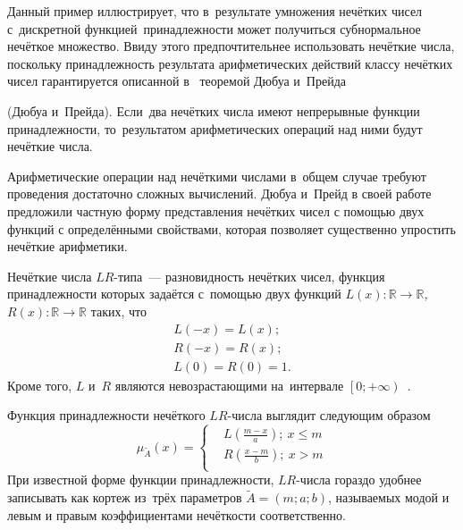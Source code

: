 Данный пример иллюстрирует, что в~результате умножения нечётких чисел с~дискретной функцией~принадлежности может получиться субнормальное нечёткое множество. Ввиду этого предпочтительнее использовать нечёткие числа, поскольку принадлежность результата арифметических действий классу нечётких чисел гарантируется описанной в~\cite{Rutkovskaya} теоремой Дюбуа и~Прейда
\begin{theorem}
\label{th:dubois-prade}
(Дюбуа и~Прейда). Если~два нечётких числа имеют непрерывные функции принадлежности, то~результатом арифметических операций над ними будут нечёткие числа.
\end{theorem}

Арифметические операции над нечёткими числами в~общем случае требуют проведения достаточно сложных вычислений. Дюбуа и~Прейд в своей работе~\cite{Dubois_Prade} предложили частную форму представления нечётких чисел с помощью двух функций с определёнными свойствами, которая позволяет существенно упростить нечёткие арифметики. 
\begin{mydef}
Нечёткие числа $LR$-типа~--– разновидность нечётких чисел, функция принадлежности которых задаётся с~помощью двух функций $L(x):\mathbb{R} \to \mathbb{R}$, $R(x):\mathbb{R} \to \mathbb{R}$ таких, что 
\begin{gather*}
	L\left( -x \right)=L\left( x \right); \\
	R\left( -x \right)=R\left( x \right); \\
	L\left( 0 \right)=R\left(  0 \right)=1.
\end{gather*}
Кроме того, $L$ и~$R$ являются невозрастающими на~интервале $\left[ 0;+\infty  \right)$~\cite{Rutkovskaya}.
\end{mydef}
Функция принадлежности нечёткого $LR$-числа выглядит следующим образом
\begin{equation}
\label{eq:membership-lr-general}
	 \mu_{\tilde A}\left( x \right)=\left\{ 
		 \begin{aligned}
			 & L\left( \frac{m-x}{a} \right);\ x \leqslant m \\ 
			 & R\left( \frac{x-m}{b} \right);\ x>m \\ 
		 \end{aligned} 
	 \right.
\end{equation}
При известной форме функции принадлежности, $LR$-числа гораздо удобнее записывать как кортеж из~трёх параметров $\tilde A = \left(m; a; b \right)$, называемых модой и левым и правым коэффициентами нечёткости соответственно.

